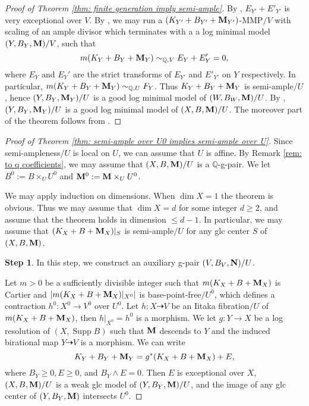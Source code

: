 \documentclass[11pt]{amsart}
\numberwithin{equation}{section}
\newcommand{\Mm}{{\bf{M}}}
\newcommand{\NN}{{\bf{N}}}
\newcommand{\Qq}{\mathbb{Q}}
\newcommand{\Supp}{\operatorname{Supp}}
\theoremstyle{definition}
\theoremstyle{definition}
\theoremstyle{definition}
\begin{document}
\begin{proof}[Proof of Theorem \ref{thm: finite generation imply semi-ample}]
By \cite[Lemma 3.2]{Bir12}, $E_{Y'}+E'_{Y'}$ is very exceptional over $V$. By \cite[Proposition 3.8]{HL22}, we may run a $(K_{Y'}+B_{Y'}+\Mm_{Y'})$-MMP$/V$ with scaling of an ample divisor which terminates with a a log minimal model $(Y,B_Y,\Mm)/V$, such that
$$
m(K_Y+B_Y+\Mm_Y)\sim_{\Qq,V}E_Y+E'_Y=0,
$$
where $E_Y$ and $E_Y'$ are the strict transforms of $E_{Y'}$ and $E'_{Y'}$ on $Y$ respectively.
In particular, $m(K_Y+B_Y+\Mm_Y)\sim_{\Qq,U}F_Y$. Thus $K_Y+B_Y+\Mm_Y$ is semi-ample$/U$, hence $(Y,B_Y,\Mm_Y)/U$ is a good log minimal model of $(W,B_W,\Mm)/U$. By \cite[Lemma 3.10]{HL21a}, $(Y,B_Y,\Mm_Y)/U$ is a good log minimal model of $(X,B,\Mm)/U$. The moreover part of the theorem follows from \cite[Theorem 2.24, Lemma 3.9]{HL21a}.
\end{proof}


\begin{proof}[Proof of Theorem \ref{thm: semi-ample over U0 implies semi-ample over U}] Since semi-ampleness$/U$ is local on $U$, we can assume that $U$ is affine. By Remark \ref{rem: to q coefficients}, we may assume that $(X,B,\Mm)/U$ is a $\Qq$-g-pair. We let $B^0:=B\times_UU^0$ and $\Mm^0:=\Mm\times_UU^0$.

We may apply induction on dimensions. When $\dim X=1$ the theorem is obvious. Thus we may assume that $\dim X=d$ for some integer $d\geq 2$, and assume that the theorem holds in dimension $\leq d-1$. In particular, we may assume that $(K_X+B+\Mm_X)|_S$ is semi-ample$/U$ for any glc center $S$ of $(X,B,\Mm)$.

\medskip

\noindent\textbf{Step 1}. In this step, we construct an auxiliary g-pair $(V,B_V,\NN)/U$.

\smallskip

 Let $m>0$ be a sufficiently divisible integer such that $m(K_X+B+\Mm_X)$ is Cartier and $|m(K_X+B+\Mm_X)|_{X^0}|$ is base-point-free$/U^0$, which defines a contraction $h^0: X^0\to V^0$ over $U^0$. Let $h: X\dashrightarrow V$ be an Iitaka fibration$/U$ of $m(K_X+B+\Mm_X)$, then $h|_{X^0}=h^0$ is a morphism. We let $g: Y\to X$ be a log resolution of $(X,\Supp B)$ such that $\Mm$ descends to $Y$ and the induced birational map $Y\dashrightarrow V$ is a morphism. We can write $$K_Y+B_Y+\Mm_Y=g^*(K_X+B+\Mm_X)+E,$$
 where $B_Y\geq 0, E\geq 0$, and $B_Y\wedge E=0$. Then $E$ is exceptional over $X$, $(X,B,\Mm)/U$ is a weak glc model of $(Y,B_Y,\Mm)/U$, and the image of any glc center of $(Y,B_Y,\Mm)$ intersects $U^0$.
 

\end{proof}
\end{document}
